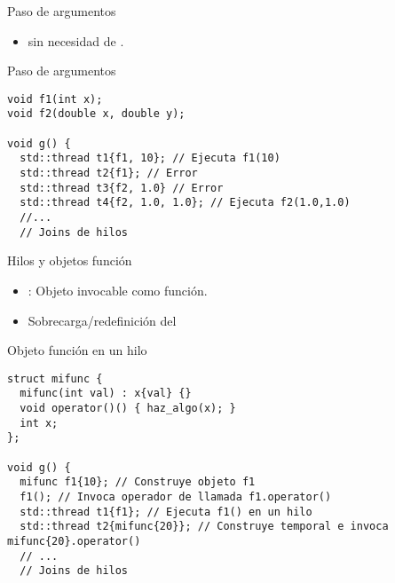 \begin{frame}[fragile]{Paso de argumentos}
\begin{itemize}
  \item {} sin necesidad de .
\end{itemize}

\begin{block}{Paso de argumentos}
\begin{lstlisting}
void f1(int x);
void f2(double x, double y);

void g() {
  std::thread t1{f1, 10}; // Ejecuta f1(10)
  std::thread t2{f1}; // Error
  std::thread t3{f2, 1.0} // Error
  std::thread t4{f2, 1.0, 1.0}; // Ejecuta f2(1.0,1.0)
  //...
  // Joins de hilos
\end{lstlisting}
\end{block}
\end{frame}

\begin{frame}[fragile]{Hilos y objetos función}
\begin{itemize}
  \item {}: Objeto invocable como función.
  \item Sobrecarga/redefinición del  \cppid{()}
\end{itemize}

\begin{block}{Objeto función en un hilo}
\begin{lstlisting}
struct mifunc {
  mifunc(int val) : x{val} {}
  void operator()() { haz_algo(x); }
  int x;
};

void g() {
  mifunc f1{10}; // Construye objeto f1
  f1(); // Invoca operador de llamada f1.operator()
  std::thread t1{f1}; // Ejecuta f1() en un hilo
  std::thread t2{mifunc{20}}; // Construye temporal e invoca mifunc{20}.operator()
  // ...
  // Joins de hilos
\end{lstlisting}
\end{block}
\end{frame}

